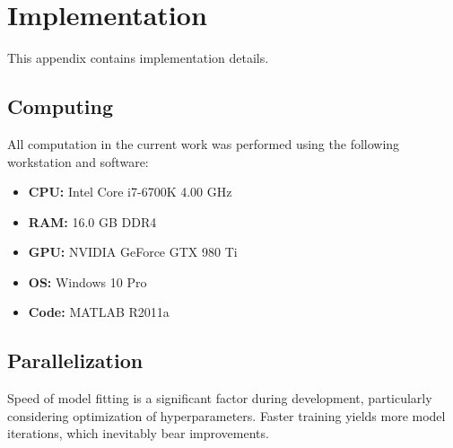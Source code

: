 \chapter{Implementation}
This appendix contains implementation details.
\section{Computing}
All computation in the current work was performed using the following workstation and software:
\begin{itemize}[topsep=0pt,itemsep=-6pt]
  \item \textbf{CPU:} Intel Core i7-6700K 4.00 GHz
  \item \textbf{RAM:} 16.0 GB DDR4
  \item \textbf{GPU:} NVIDIA GeForce GTX 980 Ti
  \item \textbf{OS:} Windows 10 Pro
  \item \textbf{Code:} MATLAB R2011a
\end{itemize}
\section{Parallelization}
Speed of model fitting is a significant factor during development,
particularly considering optimization of hyperparameters.
Faster training yields more model iterations, which inevitably bear improvements. 
